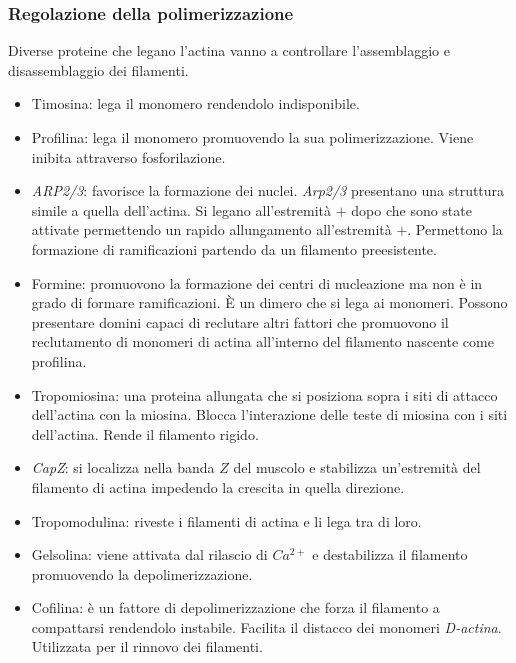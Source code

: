 		\subsubsection{Regolazione della polimerizzazione}
		Diverse proteine che legano l'actina vanno a controllare l'assemblaggio e disassemblaggio dei filamenti.
		\begin{multicols}{2}
			\begin{itemize}
				\item Timosina: lega il monomero rendendolo indisponibile.
				\item Profilina: lega il monomero promuovendo la sua polimerizzazione.
					Viene inibita attraverso fosforilazione.
				\item \emph{ARP2/3}: favorisce la formazione dei nuclei.
					\emph{Arp2/3} presentano una struttura simile a quella dell'actina.
					Si legano all'estremit\`a $+$ dopo che sono state attivate permettendo un rapido allungamento all'estremit\`a $+$.
					Permettono la formazione di ramificazioni partendo da un filamento preesistente.
				\item Formine: promuovono la formazione dei centri di nucleazione ma non \`e in grado di formare ramificazioni.
					\`E un dimero che si lega ai monomeri.
					Possono presentare domini capaci di reclutare altri fattori che promuovono il reclutamento di monomeri di actina all'interno del filamento nascente come profilina.
				\item Tropomiosina: una proteina allungata che si posiziona sopra i siti di attacco dell'actina con la miosina.
					Blocca l'interazione delle teste di miosina con i siti dell'actina.
					Rende il filamento rigido.
				\item \emph{CapZ}: si localizza nella banda $Z$ del muscolo e stabilizza un'estremit\`a del filamento di actina impedendo la crescita in quella direzione.
				\item Tropomodulina: riveste i filamenti di actina e li lega tra di loro.
				\item Gelsolina: viene attivata dal rilascio di \emph{$Ca^{2+}$} e destabilizza il filamento promuovendo la depolimerizzazione.
				\item Cofilina: \`e un fattore di depolimerizzazione che forza il filamento a compattarsi rendendolo instabile.
					Facilita il distacco dei monomeri \emph{D-actina}.
					Utilizzata per il rinnovo dei filamenti.
			\end{itemize}
		\end{multicols}

